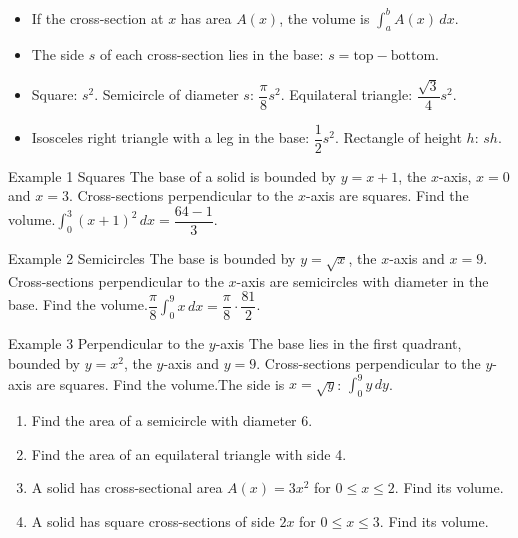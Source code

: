 \documentclass[11pt]{article}
\begin{document}

\begin{ideabox}
\begin{itemize}[leftmargin=*,itemsep=2pt,topsep=2pt]
  \item If the cross-section at $x$ has area $A(x)$, the volume is $\displaystyle\int_{a}^{b}A(x)\,dx$.
  \item The side $s$ of each cross-section lies in the base: $s=\text{top}-\text{bottom}$.
  \item Square: $s^2$. \quad Semicircle of diameter $s$: $\dfrac{\pi}{8}s^2$. \quad Equilateral triangle: $\dfrac{\sqrt3}{4}s^2$.
  \item Isosceles right triangle with a leg in the base: $\dfrac12s^2$. \quad Rectangle of height $h$: $sh$.
\end{itemize}
\end{ideabox}

\begin{example}{Example 1 \textperiodcentered{} Squares}
The base of a solid is bounded by $y=x+1$, the $x$-axis, $x=0$ and $x=3$. Cross-sections perpendicular to the $x$-axis are squares. Find the volume.\soln $\displaystyle\int_{0}^{3}(x+1)^2\,dx=\dfrac{64-1}{3}$.
\end{example}

\begin{example}{Example 2 \textperiodcentered{} Semicircles}
The base is bounded by $y=\sqrt{x}$, the $x$-axis and $x=9$. Cross-sections perpendicular to the $x$-axis are semicircles with diameter in the base. Find the volume.\soln $\dfrac\pi8\displaystyle\int_{0}^{9}x\,dx=\dfrac\pi8\cdot\dfrac{81}{2}$.
\end{example}

\begin{example}{Example 3 \textperiodcentered{} Perpendicular to the $y$-axis}
The base lies in the first quadrant, bounded by $y=x^2$, the $y$-axis and $y=9$. Cross-sections perpendicular to the $y$-axis are squares. Find the volume.\soln The side is $x=\sqrt y$: $\displaystyle\int_{0}^{9}y\,dy$.
\end{example}

\newpage
{}

\begin{enumerate}[leftmargin=*,itemsep=2pt]
  \item Find the area of a semicircle with diameter 6.\work{2.3cm}
  \item Find the area of an equilateral triangle with side 4.\work{2.3cm}
  \item A solid has cross-sectional area $A(x)=3x^2$ for $0\le x\le2$. Find its volume.\work{2.3cm}
  \item A solid has square cross-sections of side $2x$ for $0\le x\le3$. Find its volume.\work{2.3cm}
\end{enumerate}
\end{document}
